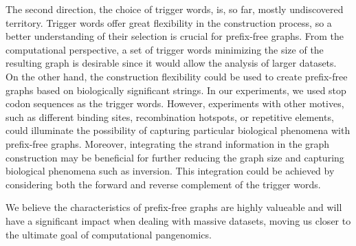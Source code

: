 The second direction, the choice of trigger words, is, so far, mostly undiscovered territory.
Trigger words offer great flexibility in the construction process, so a better understanding of their selection is crucial for prefix-free graphs.
From the computational perspective, a set of trigger words minimizing the size of the resulting graph is desirable since it would allow the analysis of larger datasets.
On the other hand, the construction flexibility could be used to create prefix-free graphs based on biologically significant strings.
In our experiments, we used stop codon sequences as the trigger words.
However, experiments with other motives, such as different binding sites, recombination hotspots, or repetitive elements, could illuminate the possibility of capturing particular biological phenomena with prefix-free graphs.
Moreover, integrating the strand information in the graph construction may be beneficial for further reducing the graph size and capturing biological phenomena such as inversion.
This integration could be achieved by considering both the forward and reverse complement of the trigger words.

We believe the characteristics of prefix-free graphs are highly valueable and will have a significant impact when dealing with massive datasets, moving us closer to the ultimate goal of computational pangenomics.

